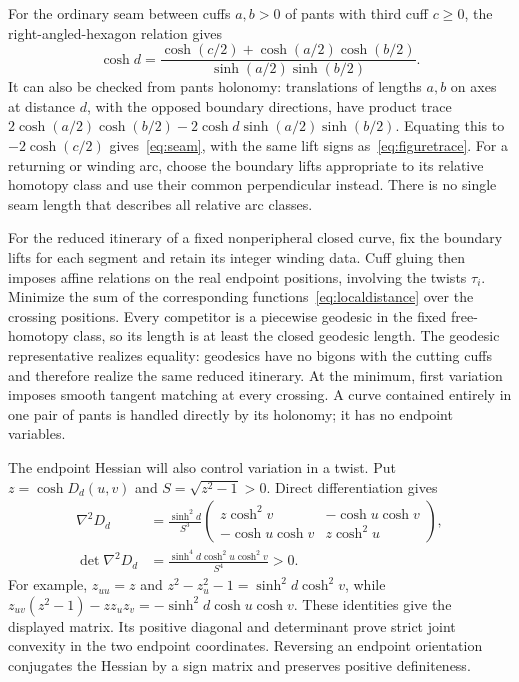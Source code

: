 For the ordinary seam between cuffs $a,b>0$ of pants with third cuff
$c\geq0$, the right-angled-hexagon relation gives
\begin{equation}
 \cosh d=\frac{\cosh(c/2)+\cosh(a/2)\cosh(b/2)}
                    {\sinh(a/2)\sinh(b/2)}.
 \label{eq:seam}
\end{equation}
It can also be checked from pants holonomy: translations of lengths
$a,b$ on axes at distance $d$, with the opposed boundary directions,
have product trace
$2\cosh(a/2)\cosh(b/2)-2\cosh d\sinh(a/2)\sinh(b/2)$.
Equating this to $-2\cosh(c/2)$ gives~\eqref{eq:seam}, with the
same lift signs as~\eqref{eq:figuretrace}.
For a returning or winding arc, choose the boundary lifts appropriate to
its relative homotopy class and use their common perpendicular instead.
There is no single seam length that describes all relative arc classes.

For the reduced itinerary of a fixed nonperipheral closed curve, fix the
boundary lifts for each segment and retain its integer winding data.
Cuff gluing then imposes affine relations on the real endpoint positions,
involving the twists $\tau_i$. Minimize the sum of the corresponding
functions~\eqref{eq:localdistance} over the crossing positions. Every
competitor is a piecewise geodesic in the fixed free-homotopy class, so its
length is at least the closed geodesic length. The geodesic representative
realizes equality: geodesics have no bigons with the cutting cuffs and
therefore realize the same reduced itinerary. At the minimum, first
variation imposes smooth tangent matching at every crossing. A curve
contained entirely in one pair of pants is handled directly by its
holonomy; it has no endpoint variables.

The endpoint Hessian will also control variation in a twist. Put
$z=\cosh D_d(u,v)$ and $S=\sqrt{z^2-1}>0$. Direct differentiation gives
\begin{equation}
 \begin{aligned}
 \nabla^2D_d&=\frac{\sinh^2d}{S^3}
 \begin{pmatrix}
 z\cosh^2v&-\cosh u\cosh v\\
 -\cosh u\cosh v&z\cosh^2u
 \end{pmatrix},\\
 \det\nabla^2D_d&=
 \frac{\sinh^4d\cosh^2u\cosh^2v}{S^4}>0.
 \end{aligned}
 \label{eq:localdistancehessian}
\end{equation}
For example, $z_{uu}=z$ and
$z^2-z_u^2-1=\sinh^2d\cosh^2v$, while
$z_{uv}(z^2-1)-zz_uz_v=-\sinh^2d\cosh u\cosh v$.
These identities give the displayed matrix. Its positive diagonal and
determinant prove strict joint convexity in the two endpoint coordinates.
Reversing an endpoint orientation conjugates the Hessian by a sign matrix
and preserves positive definiteness.

